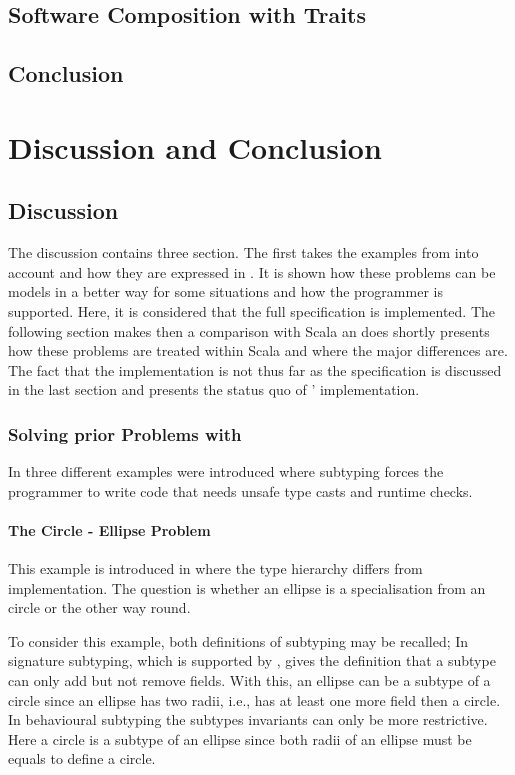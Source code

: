 \section{Software Composition with Traits}

\section{Conclusion}

\chapter{Discussion and Conclusion}
\section{Discussion}
\label{ctr:discussion}
The discussion contains three section. The first takes the examples from
 into account and how they are expressed
in \ooplss. It is shown how these problems can be models in a better
way for some situations and how the programmer is supported. Here, it
is considered that the full specification is implemented. The following
section makes then a comparison with Scala an does shortly presents how
these problems are treated within Scala and where the major differences
are. The fact that the implementation is not thus far as the specification
is discussed in the last section and presents the status quo of \ooplss'
implementation.

\subsection{Solving prior Problems with \ooplss}
In  three different examples were
introduced where subtyping forces the programmer to write code that
needs unsafe type casts and runtime checks.

\subsubsection{The Circle - Ellipse Problem}
This example is introduced in  where the type
hierarchy differs from implementation. The question is whether an ellipse
is a specialisation from an circle or the other way round.

To consider this example, both definitions of subtyping may be recalled;
In signature subtyping, which is supported by \ooplss, gives the
definition that a subtype can only add but not remove fields. With this,
an ellipse can be a subtype of a circle since an ellipse has two radii,
i.e., has at least one more field then a circle. In behavioural subtyping
the subtypes invariants can only be more restrictive. Here a circle is
a subtype of an ellipse since both radii of an ellipse must be equals
to define a circle.

